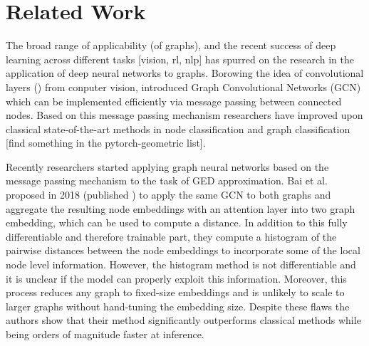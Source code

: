 \section{Related Work}






The broad range of applicability (of graphs), and the recent success of deep learning across different tasks [vision, rl, nlp] has spurred on the research in the application of deep neural networks to graphs. Borowing the idea of convolutional layers (\citealp{alexnet2012}) from conputer vision, \cite{kipf2017} introduced Graph Convolutional Networks (GCN) which can be implemented efficiently via message passing between connected nodes. Based on this message passing mechanism researchers have improved upon classical state-of-the-art methods in node classification and graph classification [find something in the pytorch-geometric list].

Recently researchers started applying graph neural networks based on the message passing mechanism to the task of GED approximation. Bai et al. proposed in 2018 (published \citealp{bai2019}) to apply the same GCN to both graphs and aggregate the resulting node embeddings with an attention layer into two graph embedding, which can be used to compute a distance. In addition to this fully differentiable and therefore trainable part, they compute a histogram of the pairwise distances between the node embeddings to incorporate some of the local node level information. However, the histogram method is not differentiable and it is unclear if the model can properly exploit this information. Moreover, this process reduces any graph to fixed-size embeddings and is unlikely to scale to larger graphs without hand-tuning the embedding size. Despite these flaws the authors show that their method significantly outperforms classical methods while being orders of magnitude faster at inference.

